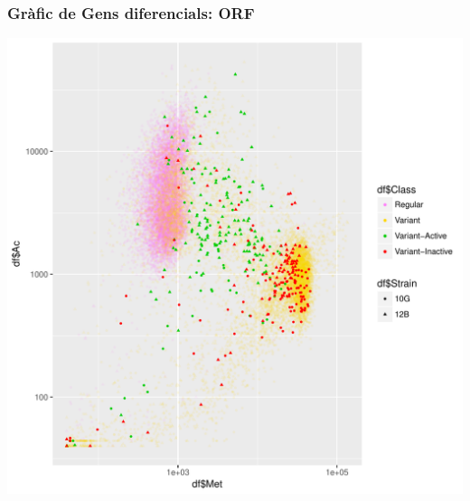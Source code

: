 \documentclass{article}\usepackage[]{graphicx}\usepackage[]{color}
\newenvironment{knitrout}{}{} %
\begin{document}
\subsubsection{Gràfic de Gens diferencials: ORF}
\begin{knitrout}
\color{fgcolor}

{\centering \includegraphics[width=1\linewidth]{figure/minimal-ac_met_log_status_10G_12B_ORF-1} 

}



\end{knitrout}
\clearpage
\end{document}
